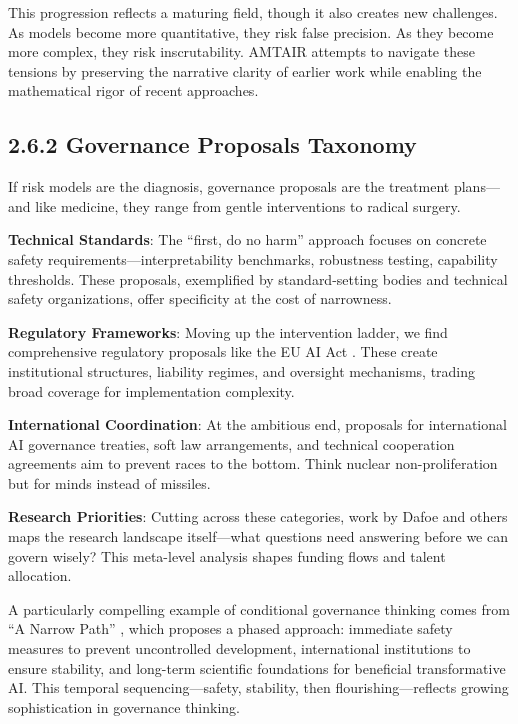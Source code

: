 \documentclass[
  11pt,
  letterpaper,
  openany]{book}
\begin{document}
This progression reflects a maturing field, though it also creates new
challenges. As models become more quantitative, they risk false
precision. As they become more complex, they risk inscrutability. AMTAIR
attempts to navigate these tensions by preserving the narrative clarity
of earlier work while enabling the mathematical rigor of recent
approaches.

\subsection{2.6.2 Governance Proposals
Taxonomy}\label{sec-governance-taxonomy}

If risk models are the diagnosis, governance proposals are the treatment
plans---and like medicine, they range from gentle interventions to
radical surgery.

\textbf{Technical Standards}: The ``first, do no harm'' approach focuses
on concrete safety requirements---interpretability benchmarks,
robustness testing, capability thresholds. These proposals, exemplified
by standard-setting bodies and technical safety organizations, offer
specificity at the cost of narrowness.

\textbf{Regulatory Frameworks}: Moving up the intervention ladder, we
find comprehensive regulatory proposals like the EU AI Act
\textcite{european2024}. These create institutional structures,
liability regimes, and oversight mechanisms, trading broad coverage for
implementation complexity.

\textbf{International Coordination}: At the ambitious end, proposals for
international AI governance treaties, soft law arrangements, and
technical cooperation agreements aim to prevent races to the bottom.
Think nuclear non-proliferation but for minds instead of missiles.

\textbf{Research Priorities}: Cutting across these categories, work by
Dafoe \textcite{dafoe2018} and others maps the research landscape
itself---what questions need answering before we can govern wisely? This
meta-level analysis shapes funding flows and talent allocation.

A particularly compelling example of conditional governance thinking
comes from ``A Narrow Path'' \textcite{miotti2024}, which proposes a
phased approach: immediate safety measures to prevent uncontrolled
development, international institutions to ensure stability, and
long-term scientific foundations for beneficial transformative AI. This
temporal sequencing---safety, stability, then flourishing---reflects
growing sophistication in governance thinking.
\end{document}
